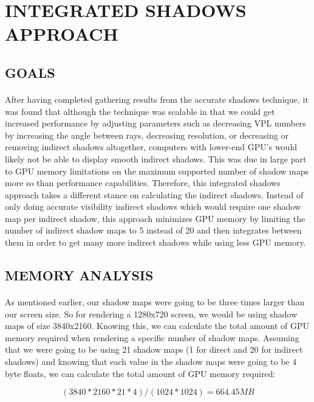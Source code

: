 \section{INTEGRATED SHADOWS APPROACH} \label{sec:newApproach}
\subsection{GOALS}
\paragraph{}
After having completed gathering results from the accurate shadows technique, it was found that although the technique was scalable in that we could get increased performance by adjusting parameters such as decreasing VPL numbers by increasing the angle between rays, decreasing resolution, or decreasing or removing indirect shadows altogether, computers with lower-end GPU's would likely not be able to display smooth indirect shadows.  This was due in large part to GPU memory limitations on the maximum supported number of shadow maps more so than performance capabilities.  Therefore, this integrated shadows approach takes a different stance on calculating the indirect shadows.  Instead of only doing accurate visibility indirect shadows which would require one shadow map per indirect shadow, this approach minimizes GPU memory by limiting the number of indirect shadow maps to 5 instead of 20 and then integrates between them in order to get many more indirect shadows while using less GPU memory.

\subsection{MEMORY ANALYSIS}
\paragraph{}
As mentioned earlier, our shadow maps were going to be three times larger than our screen size.  So for rendering a 1280x720 screen, we would be using shadow maps of size 3840x2160.  Knowing this, we can calculate the total amount of GPU memory required when rendering a specific number of shadow maps.  Assuming that we were going to be using 21 shadow maps (1 for direct and 20 for indirect shadows) and knowing that each value in the shadow maps were going to be 4 byte floats, we can calculate the total amount of GPU memory required:

\begin{equation}
(3840*2160*21*4)/(1024*1024) = 664.45 MB
\end{equation}

